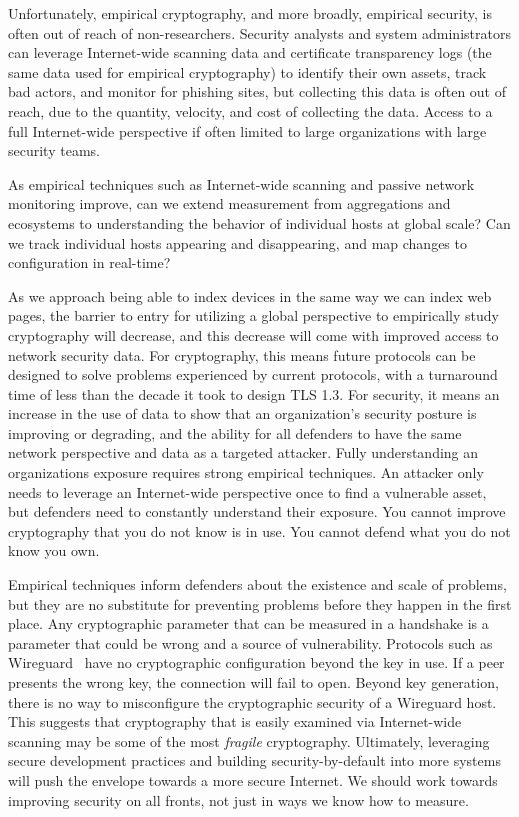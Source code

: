 Unfortunately, empirical cryptography, and more broadly, empirical security,
is often out of reach of non-researchers. Security analysts and system
administrators can leverage Internet-wide scanning data and certificate
transparency logs (the same data used for empirical cryptography) to identify
their own assets, track bad actors, and monitor for phishing sites, but
collecting this data is often out of reach, due to the quantity, velocity,
and cost of collecting the data. Access to a full Internet-wide perspective
if often limited to large organizations with large security teams.

As empirical techniques such as Internet-wide scanning and passive network
monitoring improve, can we extend measurement from aggregations and
ecosystems to understanding the behavior of individual hosts at global scale?
Can we track individual hosts appearing and disappearing, and map changes to
configuration in real-time?

As we approach being able to index devices in the same way we can index web
pages, the barrier to entry for utilizing a global perspective to empirically
study cryptography will decrease, and this decrease will come with improved
access to network security data. For cryptography, this means future
protocols can be designed to solve problems experienced by current protocols,
with a turnaround time of less than the decade it took to design TLS 1.3. For
security, it means an increase in the use of data to show that an
organization's security posture is improving or degrading, and the ability for
all defenders to have the same network perspective and data as a targeted
attacker. Fully understanding an organizations exposure requires strong
empirical techniques. An attacker only needs to leverage an Internet-wide
perspective once to find a vulnerable asset, but defenders need to constantly
understand their exposure. You cannot improve cryptography that you do not
know is in use. You cannot defend what you do not know you own.

Empirical techniques inform defenders about the existence and scale of
problems, but they are no substitute for preventing problems before they
happen in the first place. Any cryptographic parameter that can be measured
in a handshake is a parameter that could be wrong and a source of
vulnerability. Protocols such as Wireguard~\cite{wireguard-2017} have no
cryptographic configuration beyond the key in use. If a peer presents the
wrong key, the connection will fail to open. Beyond key generation, there is
no way to misconfigure the cryptographic security of a Wireguard host. This
suggests that cryptography that is easily examined via Internet-wide scanning
may be some of the most \textit{fragile} cryptography.
Ultimately, leveraging secure development practices and building
security-by-default into more systems will push the envelope towards a more
secure Internet. We should work towards improving security on all fronts, not
just in ways we know how to measure.




